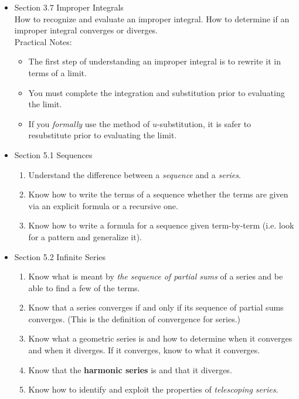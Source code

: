\documentclass[11pt,fleqn]{article}
\begin{document}
\begin{itemize}
\item Section 3.7 Improper Integrals\\

How to recognize and evaluate an improper integral. How to determine if an improper integral converges or diverges.\\

Practical Notes:
	\begin{itemize}
	\item The first step of understanding an improper integral is to rewrite it in terms of a limit.
	\item You must complete the integration and substitution prior to evaluating the limit.
	\item If you \emph{formally} use the method of $u$-substitution, it is safer to resubstitute prior to evaluating the limit.\\
	\end{itemize}

\item Section 5.1 Sequences\\

	\begin{enumerate}
	\item Understand the difference between a \emph{sequence} and a \emph{series}. 
	\item Know how to write the terms of a sequence whether the terms are given via an explicit formula or a recursive one. 
	\item Know how to write a formula for a sequence given term-by-term (i.e. look for a pattern and  generalize it).\\
	\end{enumerate}

\item Section 5.2 Infinite Series\\

	\begin{enumerate}
	\item Know what is meant by \emph{the sequence of partial sums} of a series and be able to find a few of the terms.
	\item Know that a series converges if and only if its sequence of partial sums converges. (This is the definition of convergence for series.)
	\item Know what a geometric series is and how to determine when it converges and when it diverges. If it converges, know to what it converges. 
	\item Know that the \textbf{harmonic series} is and that it diverges.
	\item Know how to identify and exploit the properties of \emph{telescoping series}.
	\end{enumerate}


\end{itemize}
\end{document}
